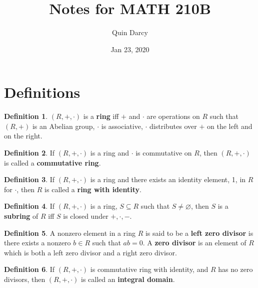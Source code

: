 \documentclass{article}
\theoremstyle{definition}
\newtheorem{definition}{Definition}[section]
\theoremstyle{remark}
\theoremstyle{definition}
\begin{document}
\title{Notes for MATH 210B}
\author{Quin Darcy}
\date{Jan 23, 2020}
\maketitle

\section{Definitions}

    \begin{definition}\label{df:1.1} 
        $(R,+,\cdot)$ is a \textbf{ring} iff $+$ and $\cdot$ are operations on $R$ such that $(R,+)$ is an Abelian group, $\cdot$ is associative, $\cdot$ distributes over $+$ on the left and on the right.
    \end{definition}
    
    \begin{definition}\label{df:1.2}
        If $(R,+,\cdot)$ is a ring and $\cdot$ is commutative on $R$, then $(R,+,\cdot)$ is called a \textbf{commutative ring}.
    \end{definition}
    
    \begin{definition}\label{df:1.3}
        If $(R,+,\cdot)$ is a ring and there exists an identity element, 1, in $R$ for $\cdot$, then $R$ is called a \textbf{ring with identity}.
    \end{definition}
    
    \begin{definition}\label{df:1.4}
        If $(R,+,\cdot)$ is a ring, $S\subseteq R$ such that $S\neq\varnothing$, then $S$ is a \textbf{subring} of $R$ iff $S$ is closed under $+,\cdot,-$. 
    \end{definition}
    
    \begin{definition}\label{df:1.5}
        A nonzero element in a ring $R$ is said to be a \textbf{left zero divisor} is there exists a nonzero $b\in R$ such that $ab=0$. A \textbf{zero divisor} is an element of $R$ which is both a left zero divisor and a right zero divisor.
    \end{definition}
    
    \begin{definition}\label{df:1.6}
        If $(R,+,\cdot)$ is commutative ring with identity, and $R$ has no zero divisors, then $(R,+,\cdot)$ is called an \textbf{integral domain}.
    \end{definition}
    
\end{document}
